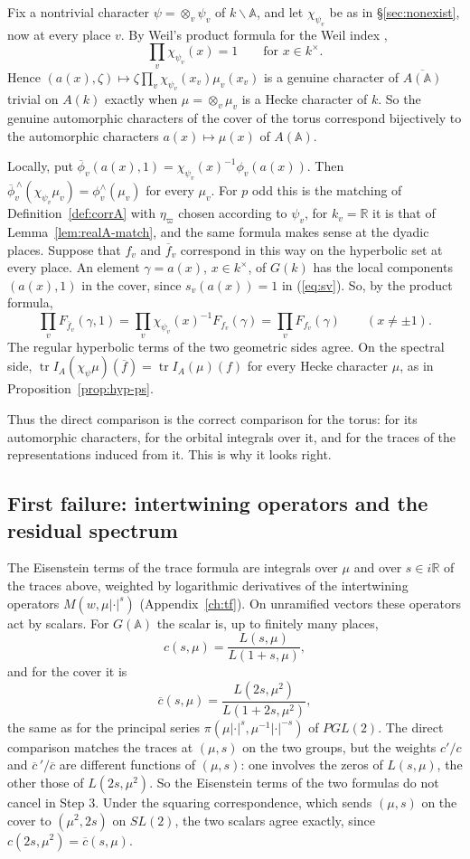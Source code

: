 \documentclass[12pt,letterpaper,openany]{book}
\theoremstyle{plain}
\theoremstyle{definition}
\theoremstyle{remark}
\theoremstyle{remark}
\newcommand{\tr}{\operatorname{tr}}
\begin{document}
Fix a nontrivial character $\psi=\otimes_v\psi_v$ of
$k\backslash{\mathbb A}$, and let $\chi_{\psi_v}$ be as in
\S\ref{sec:nonexist}, now at every place $v$. By Weil's product formula
for the Weil index \cite{We3},
\[
\prod_v\chi_{\psi_v}(x)=1\qquad\text{for }x\in k^\times .
\]
Hence $(a(x),\zeta)\mapsto\zeta\prod_v\chi_{\psi_v}(x_v)\mu_v(x_v)$ is a
genuine character of $\overline{A({\mathbb A})}$ trivial on $A(k)$ exactly
when $\mu=\otimes_v\mu_v$ is a Hecke character of $k$. So the genuine
automorphic characters of the cover of the torus correspond bijectively to
the automorphic characters $a(x)\mapsto\mu(x)$ of $A({\mathbb A})$.

Locally, put
$\overline\phi_v(a(x),1)=\chi_{\psi_v}(x)^{-1}\phi_v(a(x))$. Then
$\overline\phi_v^{\,\wedge}(\chi_{\psi_v}\mu_v)=\phi_v^{\wedge}(\mu_v)$ for
every $\mu_v$. For $p$ odd this is the matching of
Definition~\ref{def:corrA} with $\eta_\varpi$ chosen according to $\psi_v$,
for $k_v={\mathbb R}$ it is that of Lemma~\ref{lem:realA-match}, and the
same formula makes sense at the dyadic places. Suppose that $f_v$ and
$\overline f_v$ correspond in this way on the hyperbolic set at every
place. An element $\gamma=a(x)$, $x\in k^\times$, of $G(k)$ has the local
components $(a(x),1)$ in the cover, since $s_v(a(x))=1$ in
(\ref{eq:sv}). So, by the product formula,
\[
\prod_vF_{\overline f_v}(\gamma,1)=\prod_v\chi_{\psi_v}(x)^{-1}F_{f_v}(\gamma)
=\prod_vF_{f_v}(\gamma)\qquad(x\neq\pm1).
\]
The regular hyperbolic terms of the two geometric sides agree. On the
spectral side, $\tr I_A(\chi_\psi\mu)(\overline f)=\tr I_A(\mu)(f)$ for
every Hecke character $\mu$, as in Proposition~\ref{prop:hyp-ps}.

Thus the direct comparison is the correct comparison for the torus: for
its automorphic characters, for the orbital integrals over it, and for the
traces of the representations induced from it. This is why it looks
right.

\subsection*{First failure: intertwining operators and the residual spectrum}

The Eisenstein terms of the trace formula are integrals over $\mu$ and
over $s\in i{\mathbb R}$ of the traces above, weighted by logarithmic
derivatives of the intertwining operators $M(w,\mu|\cdot|^s)$
(Appendix~\ref{ch:tf}). On unramified vectors these operators act by
scalars. For $G({\mathbb A})$ the scalar is, up to finitely many places,
\[
c(s,\mu)=\frac{L(s,\mu)}{L(1+s,\mu)} ,
\]
and for the cover it is
\[
\overline c(s,\mu)=\frac{L(2s,\mu^2)}{L(1+2s,\mu^2)} ,
\]
the same as for the principal series $\pi(\mu|\cdot|^s,\mu^{-1}|\cdot|^{-s})$
of $PGL(2)$. The direct comparison matches the traces at $(\mu,s)$ on the
two groups, but the weights $c'/c$ and $\overline c\,'/\overline c$ are
different functions of $(\mu,s)$: one involves the zeros of $L(s,\mu)$,
the other those of $L(2s,\mu^2)$. So the Eisenstein terms of the two
formulas do not cancel in Step 3. Under the squaring correspondence,
which sends $(\mu,s)$ on the cover to $(\mu^2,2s)$ on $SL(2)$, the two
scalars agree exactly, since $c(2s,\mu^2)=\overline c(s,\mu)$.
\end{document}
